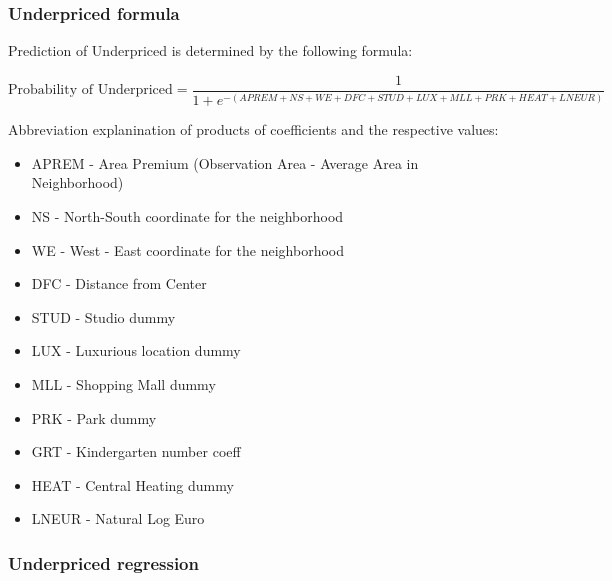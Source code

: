 \documentclass[]{article}
\begin{document}
\subsubsection{Underpriced formula}
Prediction of Underpriced is determined by the following formula:

\begin{equation*}
	\text{Probability of Underpriced} = \frac{1}{1+e^{-(APREM+NS+WE+DFC+STUD+LUX+MLL+PRK+HEAT+LNEUR)}}
\end{equation*} 

Abbreviation explanination of products of coefficients and the respective values:
\begin{itemize}
	\item[] APREM - Area Premium (Observation Area - Average Area in Neighborhood)
	\item[] NS - North-South coordinate for the neighborhood
	\item[] WE - West - East coordinate for the neighborhood
	\item[] DFC - Distance from Center
	\item[] STUD - Studio dummy
	\item[] LUX - Luxurious location dummy
	\item[] MLL - Shopping Mall dummy
	\item[] PRK - Park dummy
	\item[] GRT - Kindergarten number coeff
	\item[] HEAT - Central Heating dummy
	\item[] LNEUR - Natural Log Euro
\end{itemize}

\subsubsection{Underpriced regression}
\end{document}
